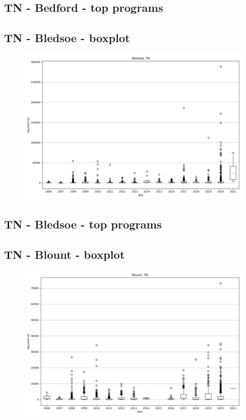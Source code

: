\subsection*{TN - Bedford - top programs}

\newpage
\subsection*{TN - Bledsoe - boxplot}
\begin{figure}[h]
\centering
\includegraphics[width=7in]{../output/boxplots/counties/Bledsoe-TN_boxplot.png}
\end{figure}


\subsection*{TN - Bledsoe - top programs}

\newpage
\subsection*{TN - Blount - boxplot}
\begin{figure}[h]
\centering
\includegraphics[width=7in]{../output/boxplots/counties/Blount-TN_boxplot.png}
\end{figure}


